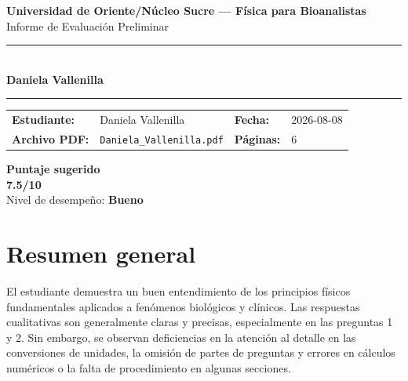 \documentclass[11pt,a4paper]{article}
\begin{document}
\begin{center}
  {\Large\bfseries\color{azulTitulo} Universidad de Oriente/Núcleo Sucre --- Física para Bioanalistas}\\[4pt]
  {\large Informe de Evaluación Preliminar}\\[12pt]
  \rule{\linewidth}{1.2pt}\\[6pt]
  {\LARGE\bfseries Daniela Vallenilla}\\[4pt]
  \rule{\linewidth}{0.6pt}
\end{center}

\vspace{4pt}
\begin{tcolorbox}[cajaTitulo, title=Datos del informe]
\begin{tabular}{@{}llll@{}}
  \textbf{Estudiante:}  & Daniela Vallenilla  &
  \textbf{Fecha:}       & 2026-08-08 \\[4pt]
  \textbf{Archivo PDF:} & \texttt{Daniela\_Vallenilla.pdf}  &
  \textbf{Páginas:}     & 6 \\
\end{tabular}
\end{tcolorbox}

\vspace{6pt}
\begin{center}
  \begin{tcolorbox}[
    enhanced,
    colback=white, colframe=desempeno_bueno,
    width=0.62\linewidth,
    boxrule=2pt,
    halign=center, valign=center,
    top=8pt, bottom=8pt,
  ]
    \centering
    {\large\bfseries Puntaje sugerido}\\[6pt]
    {\Huge\bfseries\color{desempeno_bueno} 7.5/10}\\[6pt]
    {\large Nivel de desempeño: \textbf{\color{desempeno_bueno} Bueno}}
  \end{tcolorbox}
\end{center}

\section*{Resumen general}
El estudiante demuestra un buen entendimiento de los principios físicos fundamentales aplicados a fenómenos biológicos y clínicos. Las respuestas cualitativas son generalmente claras y precisas, especialmente en las preguntas 1 y 2. Sin embargo, se observan deficiencias en la atención al detalle en las conversiones de unidades, la omisión de partes de preguntas y errores en cálculos numéricos o la falta de procedimiento en algunas secciones.
\end{document}
